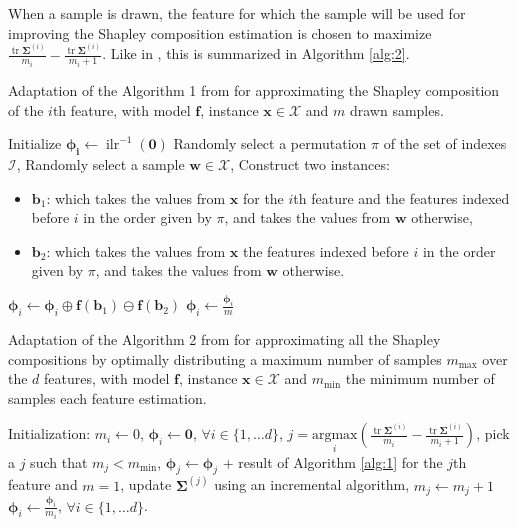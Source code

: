 \documentclass{article}
\theoremstyle{plain}
\theoremstyle{definition}
\theoremstyle{remark}
\DeclareMathOperator{\ilr}{ilr}
\DeclareMathOperator{\tr}{tr}
\begin{document}
When a sample is drawn, the feature for which the sample will be used for improving the Shapley composition estimation is chosen to maximize $\frac{\tr \bm{\Sigma}^{(i)}}{m_i} - \frac{\tr \bm{\Sigma}^{(i)}}{m_i+1}$. Like in \cite{vstrumbelj2014explaining}, this is summarized in Algorithm \ref{alg:2}.
\begin{algorithm}
   \caption{Adaptation of the Algorithm 1 from \cite{vstrumbelj2014explaining} for approximating the Shapley composition of the $i$th feature, with model $\bm{f}$, instance $\bm{x}\in\mathcal{X}$ and $m$ drawn samples.}
   \label{alg:1}
\begin{algorithmic}
   \STATE Initialize $\bm{\phi_i}\leftarrow \ilr^{-1}(\bm{0})$
   \STATE Randomly select a permutation $\pi$ of the set of indexes $\mathcal{I}$,
   \STATE Randomly select a sample $\bm{w}\in\mathcal{X}$,
   \STATE Construct two instances:
   \begin{itemize}
     \item $\bm{b}_1$: which takes the values from $\bm{x}$ for the $i$th feature and the features indexed before $i$ in the order given by $\pi$, and takes the values from $\bm{w}$ otherwise,
     \item $\bm{b}_2$: which takes the values from $\bm{x}$ the features indexed before $i$ in the order given by $\pi$, and takes the values from $\bm{w}$ otherwise.
     \end{itemize}
   \STATE $\bm{\phi}_i \leftarrow \bm{\phi}_i \oplus \bm{f}(\bm{b}_1) \ominus \bm{f}(\bm{b}_2) $
   \ENDFOR
   \STATE $\bm{\phi}_i \leftarrow \frac{\bm{\phi}_i}{m}$
\end{algorithmic}
\end{algorithm}

\begin{algorithm}
   \caption{Adaptation of the Algorithm 2 from \cite{vstrumbelj2014explaining} for approximating all the Shapley compositions by optimally distributing a maximum number of samples $m_{\text{max}}$ over the $d$ features, with model $\bm{f}$, instance $\bm{x}\in\mathcal{X}$ and $m_{\text{min}}$ the minimum number of samples each feature estimation.}
   \label{alg:2}
   \begin{algorithmic}
     \STATE Initialization: $m_{i} \leftarrow 0$, $\bm{\phi}_i \leftarrow \bm{0}$, $\forall i \in \{1, \dots d\}$,
     \STATE $j = \underset{i}{\text{argmax}} \left( \frac{\tr \bm{\Sigma}^{(i)}}{m_i} - \frac{\tr \bm{\Sigma}^{(i)}}{m_i+1} \right)$,
     \ELSE
     \STATE pick a $j$ such that $m_j < m_{\text{min}}$,
     \ENDIF
     \STATE $\bm{\phi}_j \leftarrow \bm{\phi}_j$ $+$ result of Algorithm \ref{alg:1} for the $j$th feature and $m=1$,
     \STATE update $\bm{\Sigma}^{(j)}$ using an incremental algorithm,
     \STATE $m_j \leftarrow m_j+1$
     \ENDWHILE
     \STATE $\bm{\phi}_i \leftarrow \frac{\bm{\phi}_i}{m_i}$, $\forall i \in \{1, \dots d\}$.
\end{algorithmic}
\end{algorithm}
\end{document}
